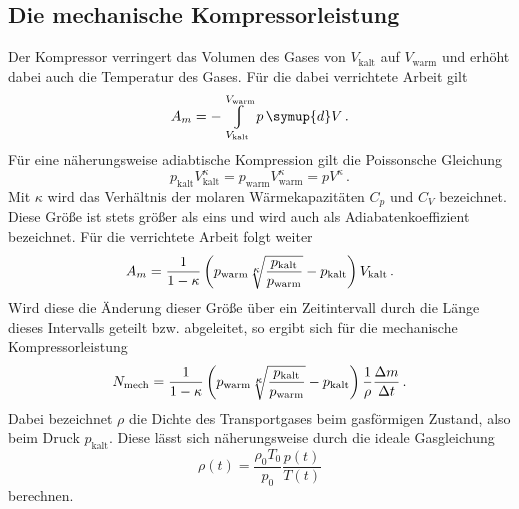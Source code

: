 \subsection{Die mechanische Kompressorleistung}
Der Kompressor verringert das Volumen des Gases von $V_\text{kalt}$ auf $V_\text{warm}$
und erhöht dabei auch die Temperatur des Gases. Für die dabei verrichtete Arbeit gilt
\begin{equation}
  A_m = - \displaystyle\varint\displaylimits_{V_\text{kalt}}^{V_\text{warm}} p \, \symup{d}V\,.
  \label{eqn:arbeitkompressor1}
\end{equation}
Für eine näherungsweise adiabtische Kompression gilt die Poissonsche Gleichung
\begin{equation}
  p_\text{kalt} V_\text{kalt}^{\kappa} = p_\text{warm} V_\text{warm}^{\kappa} = p V^{\kappa}\,.
  \label{eqn:poisson}
\end{equation}
Mit $\kappa$ wird das Verhältnis der molaren Wärmekapazitäten $C_p$ und $C_V$
bezeichnet. Diese Größe ist stets größer als eins und wird auch als Adiabatenkoeffizient bezeichnet.
Für die verrichtete Arbeit folgt weiter
\begin{equation}
  A_m = \frac{1}{1 - \kappa} \left(p_\text{warm} \sqrt[\leftroot{-1}\uproot{-1}\scriptstyle \kappa]{\frac{p_\text{kalt}}{p_\text{warm}}} - p_\text{kalt} \right) V_\text{kalt}\,.
  \label{eqn:arbeitkompressor2}
\end{equation}
Wird diese die Änderung dieser Größe über ein Zeitintervall durch die Länge dieses Intervalls
geteilt bzw. abgeleitet, so ergibt sich für die mechanische Kompressorleistung
\begin{equation}
  N_\text{mech} = \frac{1}{1 - \kappa} \left(p_\text{warm} \sqrt[\leftroot{-1}\uproot{-1}\scriptstyle \kappa]{\frac{p_\text{kalt}}{p_\text{warm}}} - p_\text{kalt} \right) \frac{1}{\rho} \frac{\Delta m}{\Delta t}\,.
  \label{eqn:kompressorleistung}
\end{equation}
Dabei bezeichnet $\rho$ die Dichte des Transportgases beim gasförmigen Zustand, also beim
Druck $p_\text{kalt}$. Diese lässt sich näherungsweise durch die ideale Gasgleichung
\begin{equation}
  \rho(t) = \frac{\rho_0 T_0}{p_0} \dfrac{p(t)}{T(t)}
  \label{eqn:rho}
\end{equation}
berechnen.
